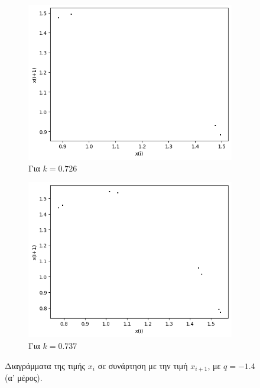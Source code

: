 \begin{figure}[ht]
\begin{subfigure}[b]{0.4\textwidth}
		\includegraphics[width=\textwidth]{LateX images/graphs q14/g15}
		\caption{Για $k=0.726$}
		\label{f:k72}
	\end{subfigure}
	\hfill
	\begin{subfigure}[b]{0.4\textwidth}
		\centering
		\includegraphics[width=\textwidth]{LateX images/graphs q14/g16}
		\caption{Για $k=0.737$}
		\label{f:k73}
	\end{subfigure}
	\hfill
	\caption{Διαγράμματα της τιμής \(x_i\) σε συνάρτηση με την τιμή \(x_{i+1}\), με $q=-1.4$ (α' μέρος).}
\end{figure}
